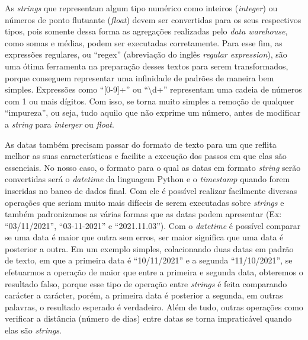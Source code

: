 As \textit{strings} que representam algum tipo numérico como inteiros (\textit{integer}) ou números de ponto flutuante (\textit{float}) devem ser convertidas para os seus respectivos tipos, pois somente dessa forma as agregações realizadas pelo \textit{data warehouse}, como somas e médias, podem ser executadas corretamente. Para esse fim, as expressões regulares, ou \enquote{regex} (abreviação do inglês \textit{regular expression}), são uma ótima ferramenta na preparação desses textos para serem transformados, porque conseguem representar uma infinidade de padrões de maneira bem simples. Expressões como \enquote{[0-9]+} ou \enquote{\textbackslash d+} representam uma cadeia de números com 1 ou mais dígitos. Com isso, se torna muito simples a remoção de qualquer \enquote{impureza}, ou seja, tudo aquilo que não exprime um número, antes de modificar a \textit{string} para \textit{interger} ou \textit{float}.

As datas também precisam passar do formato de texto para um que reflita melhor as suas características e facilite a execução dos passos em que elas são essenciais. No nosso caso, o formato para o qual as datas em formato \textit{string} serão convertidas será o \textit{datetime} da linguagem Python e o \textit{timestamp} quando forem inseridas no banco de dados final. Com ele é possível realizar facilmente diversas operações que seriam muito mais difíceis de serem executadas sobre \textit{strings} e também padronizamos as várias formas que as datas podem apresentar (Ex: \enquote{03/11/2021}, \enquote{03-11-2021} e \enquote{2021.11.03}). Com o \textit{datetime} é possível comparar se uma data é maior que outra sem erros, ser maior significa que uma data é posterior a outra. Em um exemplo simples, colacionando duas datas em padrão de texto, em que a primeira data é \enquote{10/11/2021} e a segunda \enquote{11/10/2021}, se efetuarmos a operação de maior que entre a primeira e segunda data, obteremos o resultado falso, porque esse tipo de operação entre \textit{strings} é feita comparando carácter a carácter, porém, a primeira data é posterior a segunda, em outras palavras, o resultado esperado é verdadeiro. Além de tudo, outras operações como verificar a distância (número de dias) entre datas se torna impraticável quando elas são \textit{strings}.

